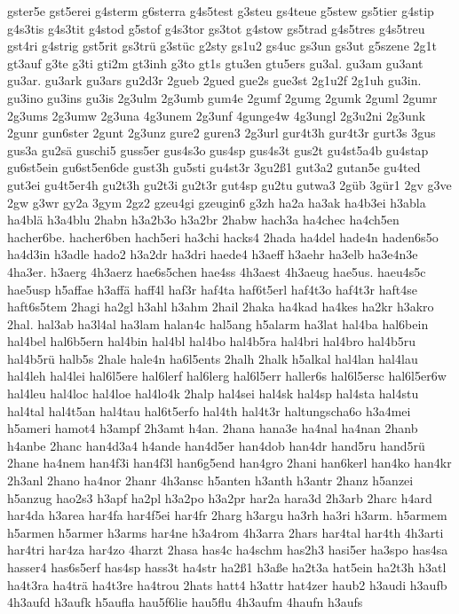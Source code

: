 {gster5e
gst5erei
g4sterm
g6sterra
g4s5test
g3steu
gs4teue
g5stew
gs5tier
g4stip
g4s3tis
g4s3tit
g4stod
g5stof
g4s3tor
gs3tot
g4stow
gs5trad
g4s5tres
g4s5treu
gst4ri
g4strig
gst5rit
gs3trü
g3stüc
g2sty
gs1u2
gs4uc
gs3un
gs3ut
g5szene
2g1t
gt3auf
g3te
g3ti
gti2m
gt3inh
g3to
gt1s
gtu3en
gtu5ers
gu3al.
gu3am
gu3ant
gu3ar.
gu3ark
gu3ars
gu2d3r
2gueb
2gued
gue2s
gue3st
2g1u2f
2g1uh
gu3in.
gu3ino
gu3ins
gu3is
2g3ulm
2g3umb
gum4e
2gumf
2gumg
2gumk
2guml
2gumr
2g3ums
2g3umw
2g3una
4g3unem
2g3unf
4gunge4w
4g3ungl
2g3u2ni
2g3unk
2gunr
gun6ster
2gunt
2g3unz
gure2
guren3
2g3url
gur4t3h
gur4t3r
gurt3s
3gus
gus3a
gu2sä
guschi5
guss5er
gus4s3o
gus4sp
gus4s3t
gus2t
gu4st5a4b
gu4stap
gu6st5ein
gu6st5en6de
gust3h
gu5sti
gu4st3r
3gu2ß1
gut3a2
gutan5e
gu4ted
gut3ei
gu4t5er4h
gu2t3h
gu2t3i
gu2t3r
gut4sp
gu2tu
gutwa3
2güb
3gür1
2gv
g3ve
2gw
g3wr
gy2a
3gym
2gz2
gzeu4gi
gzeugin6
g3zh
ha2a
ha3ak
ha4b3ei
h3abla
ha4blä
h3a4blu
2habn
h3a2b3o
h3a2br
2habw
hach3a
ha4chec
ha4ch5en
hacher6be.
hacher6ben
hach5eri
ha3chi
hacks4
2hada
ha4del
hade4n
haden6s5o
ha4d3in
h3adle
hado2
h3a2dr
ha3dri
haede4
h3aeff
h3aehr
ha3elb
ha3e4n3e
4ha3er.
h3aerg
4h3aerz
hae6s5chen
hae4ss
4h3aest
4h3aeug
hae5us.
haeu4s5c
hae5usp
h5affae
h3affä
haff4l
haf3r
haf4ta
haf6t5erl
haf4t3o
haf4t3r
haft4se
haft6s5tem
2hagi
ha2gl
h3ahl
h3ahm
2hail
2haka
ha4kad
ha4kes
ha2kr
h3akro
2hal.
hal3ab
ha3l4al
ha3lam
halan4c
hal5ang
h5alarm
ha3lat
hal4ba
hal6bein
hal4bel
hal6b5ern
hal4bin
hal4bl
hal4bo
hal4b5ra
hal4bri
hal4bro
hal4b5ru
hal4b5rü
halb5s
2hale
hale4n
ha6l5ents
2halh
2halk
h5alkal
hal4lan
hal4lau
hal4leh
hal4lei
hal6l5ere
hal6lerf
hal6lerg
hal6l5err
haller6s
hal6l5ersc
hal6l5er6w
hal4leu
hal4loc
hal4loe
hal4lo4k
2halp
hal4sei
hal4sk
hal4sp
hal4sta
hal4stu
hal4tal
hal4t5an
hal4tau
hal6t5erfo
hal4th
hal4t3r
haltungscha6o
h3a4mei
h5ameri
hamot4
h3ampf
2h3amt
h4an.
2hana
hana3e
ha4nal
ha4nan
2hanb
h4anbe
2hanc
han4d3a4
h4ande
han4d5er
han4dob
han4dr
hand5ru
hand5rü
2hane
ha4nem
han4f3i
han4f3l
han6g5end
han4gro
2hani
han6kerl
han4ko
han4kr
2h3anl
2hano
ha4nor
2hanr
4h3ansc
h5anten
h3anth
h3antr
2hanz
h5anzei
h5anzug
hao2s3
h3apf
ha2pl
h3a2po
h3a2pr
har2a
hara3d
2h3arb
2harc
h4ard
har4da
h3area
har4fa
har4f5ei
har4fr
2harg
h3argu
ha3rh
ha3ri
h3arm.
h5armem
h5armen
h5armer
h3arms
har4ne
h3a4rom
4h3arra
2hars
har4tal
har4th
4h3arti
har4tri
har4za
har4zo
4harzt
2hasa
has4c
ha4schm
has2h3
hasi5er
ha3spo
has4sa
hasser4
has6s5erf
has4sp
hass3t
ha4str
ha2ß1
h3aße
ha2t3a
hat5ein
ha2t3h
h3atl
ha4t3ra
ha4trä
ha4t3re
ha4trou
2hats
hatt4
h3attr
hat4zer
haub2
h3audi
h3aufb
4h3aufd
h3aufk
h5aufla
hau5f6lie
hau5flu
4h3aufm
4haufn
h3aufs
}

